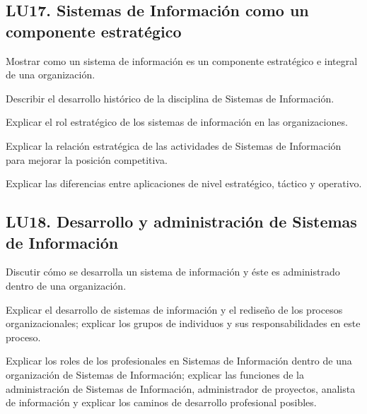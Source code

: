 \subsection{LU17. Sistemas de Información como un componente estratégico}\label{sec:BOK-LU17}\label{sec:LU17}
\begin{LearningUnit}
\begin{LUGoal}
\item Mostrar como un sistema de información es un componente estratégico e integral de una organización.
\end{LUGoal}

\begin{LUObjective}
\item Describir el desarrollo histórico de la disciplina de Sistemas de Información.
\item Explicar el rol estratégico de los sistemas de información en las organizaciones.
\item Explicar la relación estratégica de las actividades de Sistemas de Información para mejorar la posición competitiva.
\item Explicar las diferencias entre aplicaciones de nivel estratégico, táctico y operativo.
\end{LUObjective}
\end{LearningUnit}

\subsection{LU18. Desarrollo y administración de Sistemas de Información}\label{sec:BOK-LU18}\label{sec:LU18}
\begin{LearningUnit}
\begin{LUGoal}
\item Discutir cómo se desarrolla un sistema de información y éste es administrado dentro de una organización.
\end{LUGoal}

\begin{LUObjective}
\item Explicar el desarrollo de sistemas de información y el rediseño de los procesos organizacionales; explicar los grupos de individuos y sus responsabilidades en este proceso.
\item Explicar los roles de los profesionales en Sistemas de Información dentro de una organización de Sistemas de Información; explicar las funciones de la administración de Sistemas de Información, administrador de proyectos, analista de información y explicar los caminos de desarrollo profesional posibles.
\end{LUObjective}
\end{LearningUnit}

